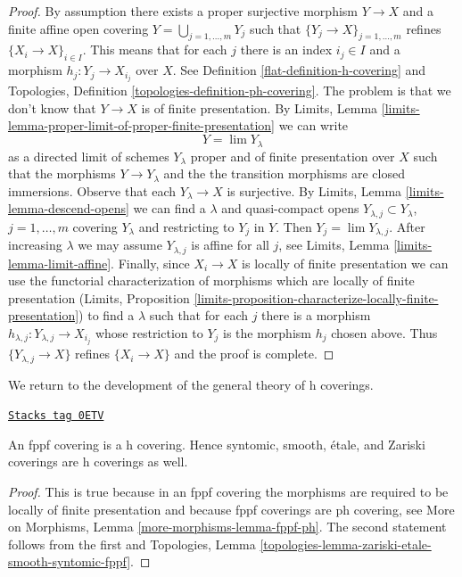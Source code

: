 \begin{proof}

By assumption there exists a proper surjective morphism
$Y \to X$ and a finite affine open covering
$Y = \bigcup_{j = 1, \ldots, m} Y_j$ such that
$\{Y_j \to X\}_{j = 1, \ldots, m}$ refines $\{X_i \to X\}_{i \in I}$.
This means that for each $j$ there is an index $i_j \in I$
and a morphism $h_j : Y_j \to X_{i_j}$ over $X$.
See Definition \ref{flat-definition-h-covering} and
Topologies, Definition \ref{topologies-definition-ph-covering}.
The problem is that we don't know that $Y \to X$ is of finite
presentation.
By
Limits, Lemma \ref{limits-lemma-proper-limit-of-proper-finite-presentation}
we can write
$$
Y = \lim Y_\lambda
$$
as a directed limit of schemes $Y_\lambda$ proper and of finite presentation
over $X$ such that the morphisms $Y \to Y_\lambda$ and the
the transition morphisms are closed immersions. Observe that
each $Y_\lambda \to X$ is surjective.
By Limits, Lemma \ref{limits-lemma-descend-opens}
we can find a $\lambda$ and quasi-compact opens
$Y_{\lambda, j} \subset Y_\lambda$, $j = 1, \ldots, m$
covering $Y_\lambda$ and restricting to $Y_j$ in $Y$.
Then $Y_j = \lim Y_{\lambda, j}$.
After increasing $\lambda$ we may assume $Y_{\lambda, j}$
is affine for all $j$, see
Limits, Lemma \ref{limits-lemma-limit-affine}.
Finally, since $X_i \to X$ is locally of finite presentation
we can use the functorial characterization of morphisms
which are locally of finite presentation
(Limits, Proposition
\ref{limits-proposition-characterize-locally-finite-presentation})
to find a $\lambda$ such that for each $j$ there is
a morphism $h_{\lambda, j} : Y_{\lambda, j} \to X_{i_j}$
whose restriction to $Y_j$ is the morphism $h_j$ chosen above.
Thus $\{Y_{\lambda, j} \to X\}$ refines
$\{X_i \to X\}$ and the proof is complete.
\end{proof}

We return to the development of the general theory of h coverings.

\begin{lemma}[Zariski h]
\label{flat-lemma-zariski-h}
\href{https://stacks.math.columbia.edu/tag/0ETV}{\texttt{Stacks tag 0ETV}}

An fppf covering is a h covering. Hence syntomic, smooth, \'etale,
and Zariski coverings are h coverings as well.
\end{lemma}

\begin{proof}
This is true because in an fppf covering the morphisms are
required to be locally of finite presentation and because
fppf coverings are ph covering, see More on Morphisms,
Lemma \ref{more-morphisms-lemma-fppf-ph}.
The second statement follows from the first and
Topologies, Lemma \ref{topologies-lemma-zariski-etale-smooth-syntomic-fppf}.
\end{proof}

